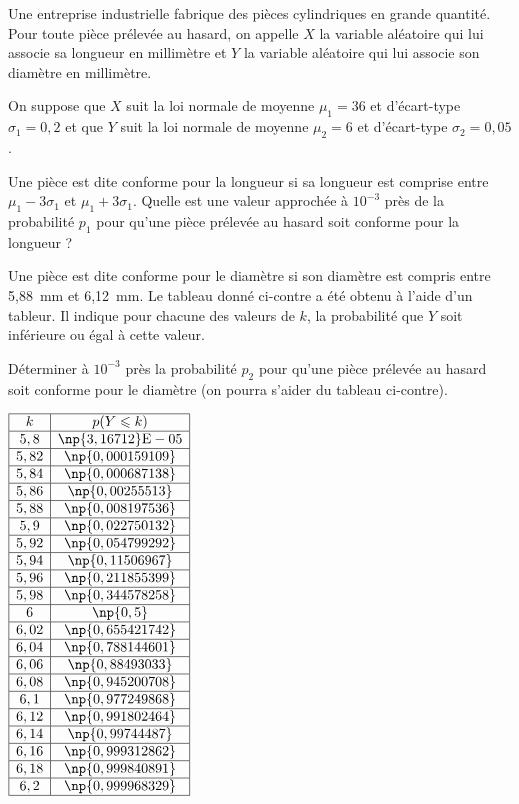 \documentclass[10pt]{article}
\begin{document}
Une entreprise industrielle fabrique des pièces cylindriques en grande quantité. Pour toute pièce prélevée au hasard, on appelle $X$ la variable aléatoire qui lui associe sa longueur en millimètre et $Y$ la variable aléatoire qui lui associe son diamètre en millimètre.
 
On suppose que $X$ suit la loi normale de moyenne $\mu_{1} = 36$ et d'écart-type $\sigma_{1} = 0,2$ et que $Y$ suit 
la loi normale de moyenne $\mu_{2} = 6$ et d'écart-type $\sigma_{2} = 0,05$.

\medskip
 
\begin{enumerate}
\item Une pièce est dite conforme pour la longueur si sa longueur est comprise entre $\mu_{1} - 3\sigma_{1}$ et $\mu_{1} + 3\sigma_{1}$. Quelle est une valeur approchée à $10^{- 3}$ près de la probabilité $p_{1}$ pour qu'une pièce prélevée au hasard soit conforme pour la longueur ?

\medskip 
\parbox{0.65\linewidth}{\item Une pièce est dite conforme pour le diamètre si son diamètre est compris entre 5,88~mm et 6,12~mm. Le tableau donné ci-contre a été obtenu à l'aide d'un tableur. Il indique pour chacune des valeurs de $k$, la probabilité que $Y$ soit inférieure ou égal à cette valeur.
 
Déterminer à $10^{- 3}$ près la probabilité $p_{2}$ pour qu'une pièce prélevée au hasard soit conforme pour le diamètre (on pourra s'aider du tableau ci-contre).}\hfill
\parbox{0.3\linewidth}{$\begin{array}{|c|c|}\hline 
k		& p(Y \leqslant k)\\ \hline 
5,8 	&\np{3,16712}\text{E}-05\\ \hline 
5,82 	&\np{0,000159109}\\ \hline 
5,84 	&\np{0,000687138}\\ \hline 
5,86 	&\np{0,00255513}\\ \hline 
5,88 	&\np{0,008197536}\\ \hline 
5,9 	&\np{0,022750132}\\ \hline 
5,92 	&\np{0,054799292}\\ \hline 
5,94 	&\np{0,11506967} \\ \hline
5,96 	&\np{0,211855399}\\ \hline 
5,98 	&\np{0,344578258}\\ \hline 
6 		&\np{0,5}\\ \hline 
6,02 	&\np{0,655421742}\\ \hline 
6,04 	&\np{0,788144601}\\ \hline 
6,06 	&\np{0,88493033}\\ \hline 
6,08 	&\np{0,945200708}\\ \hline 
6,1 	&\np{0,977249868}\\ \hline 
6,12 	&\np{0,991802464}\\ \hline 
6,14 	&\np{0,99744487}\\ \hline 
6,16 	&\np{0,999312862}\\ \hline 
6,18 	&\np{0,999840891}\\ \hline  
6,2 	&\np{0,999968329}\\ \hline
\end{array}$} 


\end{enumerate}
\end{document}
